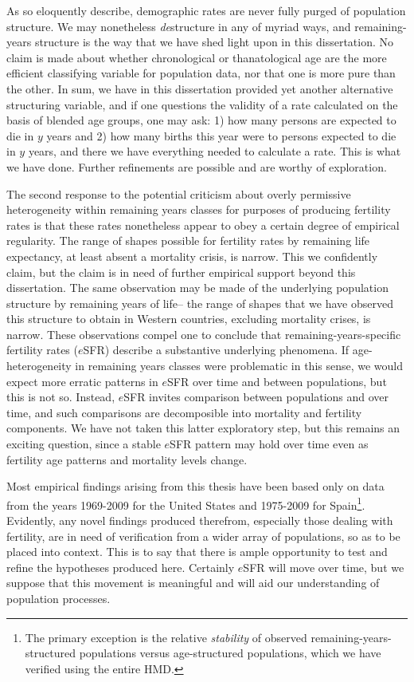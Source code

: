 As \citet{stolnitz1949recent} so eloquently describe, demographic rates are
never fully purged of population structure. We may nonetheless \textit{de}structure in
any of myriad ways, and remaining-years structure is the way that we have shed
light upon in this dissertation. No claim is made about whether chronological or
thanatological age are the more efficient classifying variable for population
data, nor that one is more pure than the other. In sum, we have in this
dissertation provided yet another alternative structuring variable, and if one
questions the validity of a rate calculated on the basis of blended age groups,
one may ask: 1) how many persons are expected to die in $y$ years and 2) how
many births this year were to persons expected to die in $y$ years, and there we
have everything needed to calculate a rate. This is what we have done. Further
refinements are possible and are worthy of exploration.

The second response to the potential criticism about overly permissive
heterogeneity within remaining years classes for purposes of producing
fertility rates is that these rates nonetheless appear to obey a
certain degree of empirical regularity. The range of shapes possible for
fertility rates by remaining life expectancy, at least absent a mortality
crisis, is narrow. This we confidently claim, but the claim is in need of
further empirical support beyond this dissertation. The same observation may be made of
the underlying population structure by remaining years of life-- the range of 
shapes that we have observed this structure to obtain in Western countries, 
excluding mortality crises, is
narrow. These observations compel one to conclude that
remaining-years-specific fertility rates ($e$SFR) describe a substantive
underlying phenomena. If age-heterogeneity in remaining years classes 
were problematic in this sense, we would expect more erratic patterns in
$e$SFR over time and between populations, but this is not so. Instead, $e$SFR
invites comparison between populations and over time, and such comparisons are
decomposible into mortality and fertility components. We have not
taken this latter exploratory step, but this remains an exciting question, since
a stable $e$SFR pattern may hold over time even as fertility age patterns and
mortality levels change.

Most empirical findings arising from this thesis have been based only on data
from the years 1969-2009 for the United States and 1975-2009 for
Spain\footnote{The primary exception is the relative \textit{stability} of
observed remaining-years-structured populations versus age-structured
populations, which we have verified using the entire HMD.}. Evidently, any
novel findings produced therefrom, especially those dealing with fertility, 
are in need of verification from a wider array of
populations, so as to be placed into context. This is to say that there is ample opportunity to test
and refine the hypotheses produced here. Certainly $e$SFR will move over time,
but we suppose that this movement is meaningful and will aid our understanding
of population processes.

